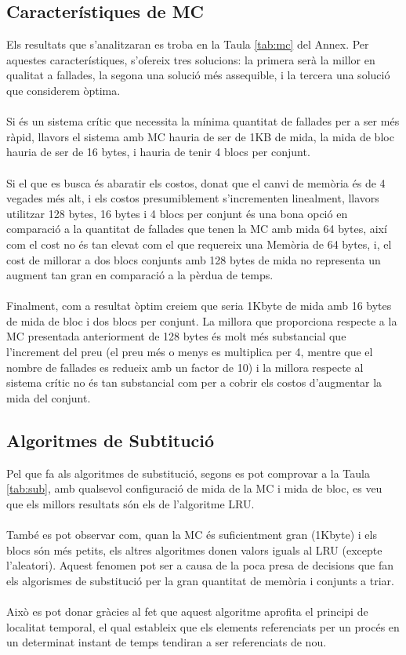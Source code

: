 \documentclass{article}
\begin{document}
\subsection{Característiques de MC}
Els resultats que s'analitzaran es troba en la Taula \ref{tab:mc} del Annex. Per aquestes
característiques, s'ofereix tres solucions: la primera serà la millor en qualitat a fallades,
la segona una solució més assequible, i la tercera una solució que considerem òptima.\\
\\
Si és un sistema crític que necessita la mínima quantitat de fallades per a ser més
ràpid, llavors el sistema amb MC hauria de ser de 1KB
de mida, la mida de bloc hauria de ser de 16 bytes, i hauria de tenir 4 blocs per conjunt.\\
\\
Si el que es busca és abaratir els costos, donat que el canvi de memòria és de 4 vegades més
alt, i els costos presumiblement s'incrementen linealment, llavors utilitzar 128 bytes, 16 bytes i
4 blocs per conjunt és una bona opció en comparació a la quantitat de fallades que tenen la MC amb
mida 64 bytes, així com el cost no és tan elevat com el que requereix una Memòria de 64 bytes,
i, el cost de millorar a dos blocs conjunts amb 128 bytes de mida no representa un augment tan gran
en comparació a la pèrdua de temps.\\
\\
Finalment, com a resultat òptim creiem que seria 1Kbyte de mida amb 16 bytes de mida de bloc i
dos blocs per conjunt. La millora que proporciona respecte a la MC presentada anteriorment de 128 bytes
és molt més substancial que l'increment del preu (el preu més o menys es multiplica per 4, mentre que
el nombre de fallades es redueix amb un factor de 10) i la millora respecte al sistema crític no
és tan substancial com per a cobrir els costos d'augmentar la mida del conjunt.
\subsection{Algoritmes de Subtitució}
Pel que fa als algoritmes de substitució, segons es pot comprovar a la Taula \ref{tab:sub},
amb qualsevol configuració de mida de la MC i mida de bloc, es veu
que els millors resultats són els de l'algoritme LRU.\\
\\
També es pot observar com, quan la MC és suficientment gran (1Kbyte) i els blocs són
més petits, els altres algoritmes donen valors iguals al LRU (excepte l'aleatori).
Aquest fenomen pot ser a causa de la poca presa de decisions que fan els algorismes
de substitució per la gran quantitat de memòria i conjunts a triar.\\
\\
Això es pot donar gràcies al fet que aquest algoritme aprofita
el principi de localitat temporal, el qual estableix que els
elements referenciats per un procés en un determinat instant
de temps tendiran a ser referenciats de nou.
\end{document}
